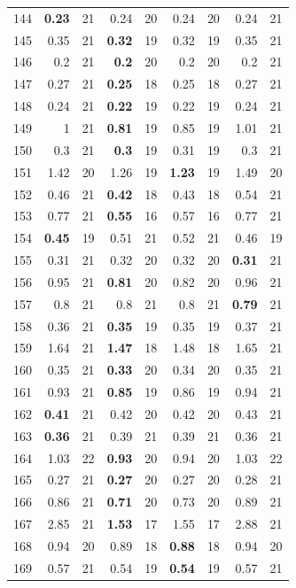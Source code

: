 \begin{longtable}{lr@{\hskip 4pt}l@{\hskip 12pt}r@{\hskip 4pt}l@{\hskip 12pt}r@{\hskip 4pt}l@{\hskip 12pt}r@{\hskip 4pt}l@{\hskip 12pt}}
144 & \textbf{0.23} & 21 & 0.24 & 20 & 0.24 & 20 & 0.24 & 21 \\
145 & 0.35 & 21 & \textbf{0.32} & 19 & 0.32 & 19 & 0.35 & 21 \\
146 & 0.2 & 21 & \textbf{0.2} & 20 & 0.2 & 20 & 0.2 & 21 \\
147 & 0.27 & 21 & \textbf{0.25} & 18 & 0.25 & 18 & 0.27 & 21 \\
148 & 0.24 & 21 & \textbf{0.22} & 19 & 0.22 & 19 & 0.24 & 21 \\
149 & 1 & 21 & \textbf{0.81} & 19 & 0.85 & 19 & 1.01 & 21 \\
150 & 0.3 & 21 & \textbf{0.3} & 19 & 0.31 & 19 & 0.3 & 21 \\
151 & 1.42 & 20 & 1.26 & 19 & \textbf{1.23} & 19 & 1.49 & 20 \\
152 & 0.46 & 21 & \textbf{0.42} & 18 & 0.43 & 18 & 0.54 & 21 \\
153 & 0.77 & 21 & \textbf{0.55} & 16 & 0.57 & 16 & 0.77 & 21 \\
154 & \textbf{0.45} & 19 & 0.51 & 21 & 0.52 & 21 & 0.46 & 19 \\
155 & 0.31 & 21 & 0.32 & 20 & 0.32 & 20 & \textbf{0.31} & 21 \\
156 & 0.95 & 21 & \textbf{0.81} & 20 & 0.82 & 20 & 0.96 & 21 \\
157 & 0.8 & 21 & 0.8 & 21 & 0.8 & 21 & \textbf{0.79} & 21 \\
158 & 0.36 & 21 & \textbf{0.35} & 19 & 0.35 & 19 & 0.37 & 21 \\
159 & 1.64 & 21 & \textbf{1.47} & 18 & 1.48 & 18 & 1.65 & 21 \\
160 & 0.35 & 21 & \textbf{0.33} & 20 & 0.34 & 20 & 0.35 & 21 \\
161 & 0.93 & 21 & \textbf{0.85} & 19 & 0.86 & 19 & 0.94 & 21 \\
162 & \textbf{0.41} & 21 & 0.42 & 20 & 0.42 & 20 & 0.43 & 21 \\
163 & \textbf{0.36} & 21 & 0.39 & 21 & 0.39 & 21 & 0.36 & 21 \\
164 & 1.03 & 22 & \textbf{0.93} & 20 & 0.94 & 20 & 1.03 & 22 \\
165 & 0.27 & 21 & \textbf{0.27} & 20 & 0.27 & 20 & 0.28 & 21 \\
166 & 0.86 & 21 & \textbf{0.71} & 20 & 0.73 & 20 & 0.89 & 21 \\
167 & 2.85 & 21 & \textbf{1.53} & 17 & 1.55 & 17 & 2.88 & 21 \\
168 & 0.94 & 20 & 0.89 & 18 & \textbf{0.88} & 18 & 0.94 & 20 \\
169 & 0.57 & 21 & 0.54 & 19 & \textbf{0.54} & 19 & 0.57 & 21 \\

\end{longtable}
